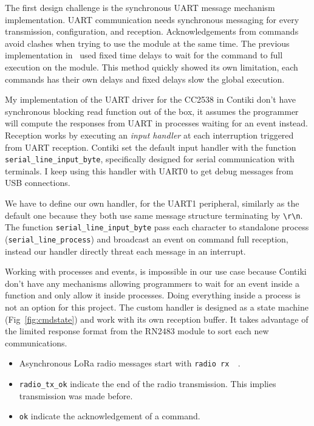 The first design challenge is the
synchronous UART message mechanism implementation.
UART communication needs synchronous messaging for every
transmission, configuration, and reception.
Acknowledgements from commands avoid 
clashes when trying to use the module at the same time.
The previous implementation in~\cite{8847137} used fixed time delays to 
wait for the command to full execution on the module. This method 
quickly showed its own limitation, each commands has their own delays and
fixed delays slow the global execution.


My implementation of the UART driver for the CC2538 in Contiki don't have synchronous 
blocking read function out of the box, it assumes the programmer will compute the
responses from UART in processes waiting for an event instead.
Reception works by executing an \emph{input handler} at each interruption
triggered from UART reception.
Contiki set the default input handler with the function
\lstinline{serial_line_input_byte},
specifically designed for serial communication with terminals. 
I keep using this handler with UART0 to get debug messages from USB connections.

We have to define our own handler, for the UART1 peripheral, similarly as the
default one because they both use same message structure terminating by
\lstinline{\r\n}.
The function \lstinline{serial_line_input_byte} pass each character to standalone
process (\lstinline{serial_line_process}) and broadcast an event on command
full reception, instead our handler directly threat each message in an
interrupt.

Working with processes and events, is impossible in our use case because Contiki 
don't have any mechanisms allowing programmers to wait for an event inside a 
function and only allow it inside processes.
Doing everything inside a process is not an option for this project.
The custom handler is designed as a state machine (Fig~\ref{fig:cmdstate}) and 
work with its own reception buffer. It takes advantage of the limited response 
format from the RN2483 module to sort each new communications.

\begin{itemize}
  \item Asynchronous LoRa radio messages start with \lstinline{radio rx  }.
  \item \lstinline{radio_tx_ok} indicate the end of the radio transmission. 
    This implies transmission was made before.
  \item \lstinline{ok} indicate the acknowledgement of a command.
\end{itemize}

